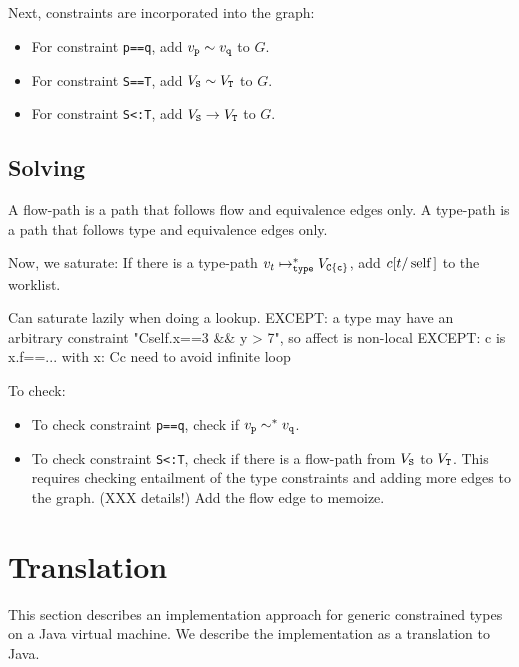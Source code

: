 \documentclass[preprint,nocopyrightspace,9pt]{sigplanconf}
\begin{document}
Next, constraints are incorporated into the graph:

\begin{itemize}
\item
For constraint {\tt p==q}, add $v_{\tt p} \eqedge v_{\tt q}$ to $G$.

\item
For constraint {\tt S==T}, add $V_{\tt S} \eqedge V_{\tt T}$ to $G$.

\item
For constraint {\tt S<:T},
add $V_{\tt S} \flowedge V_{\tt T}$
to $G$.

\end{itemize}

\subsection{Solving}

A flow-path is a path that follows flow and equivalence edges
only.
A type-path is a path that follows type and equivalence edges
only.

Now, we saturate: 
If there is a type-path $v_t \typeedge^* V_{\tt C\{c\}}$,
add $c[t/\Xcd{self}]$ to the worklist.

        Can saturate lazily when doing a lookup.
        EXCEPT: a type may have an arbitrary constraint
                \xcd"C{self.x==3 && y > 7}", so affect is non-local
        EXCEPT: c is x.f==...
                with x: C{c}
                need to avoid infinite loop

To check:

\begin{itemize}
\item To check
constraint {\tt p==q}, check if $v_{\tt p} \eqedge^* v_{\tt q}$.
\item To check
constraint {\tt S<:T}, check if there is a flow-path from $V_{\tt S}$ to
$V_{\tt T}$.  This requires checking entailment of the type constraints and
adding more edges to the graph.  (XXX details!)
Add the flow edge to memoize.
\end{itemize}

\section{Translation}
\label{sec:translation}

This section describes an implementation approach for
generic constrained types on a Java virtual machine.
We describe the implementation as a translation to Java.
\end{document}
